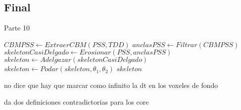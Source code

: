 \subsection{Final}

\begin{algorithm}[H]
\caption{Parte 10}
\begin{algorithmic}[1]
    \State $CBMPSS \gets ExtraerCBM(PSS, TDD)$
    \State $anclasPSS \gets Filtrar(CBMPSS)$
    \State $skeletonCasiDelgado \gets Erosionar(PSS, anclasPSS)$
    \State $skeleton \gets Adelgazar(skeletonCasiDelgado)$
    \State $skeleton \gets Podar(skeleton, \theta_1, \theta_2)$ \label{ddprune2}
    \State \Return $skeleton$
\EndFunction
\end{algorithmic}
\end{algorithm}

no dice que hay que marcar como infinito la dt en los voxeles de fondo

da dos definiciones contradictorias para los core